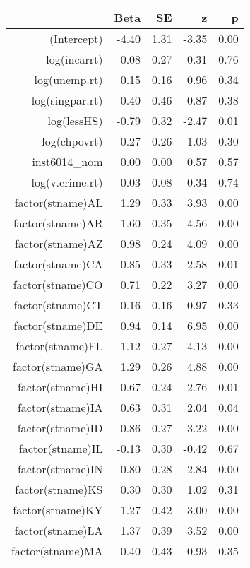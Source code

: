 \begin{table}[ht]
\centering
\begin{tabular}{rrrrr}
  \hline
 & Beta & SE & z & p \\ 
  \hline
(Intercept) & -4.40 & 1.31 & -3.35 & 0.00 \\ 
  log(incarrt) & -0.08 & 0.27 & -0.31 & 0.76 \\ 
  log(unemp.rt) & 0.15 & 0.16 & 0.96 & 0.34 \\ 
  log(singpar.rt) & -0.40 & 0.46 & -0.87 & 0.38 \\ 
  log(lessHS) & -0.79 & 0.32 & -2.47 & 0.01 \\ 
  log(chpovrt) & -0.27 & 0.26 & -1.03 & 0.30 \\ 
  inst6014\_nom & 0.00 & 0.00 & 0.57 & 0.57 \\ 
  log(v.crime.rt) & -0.03 & 0.08 & -0.34 & 0.74 \\ 
  factor(stname)AL & 1.29 & 0.33 & 3.93 & 0.00 \\ 
  factor(stname)AR & 1.60 & 0.35 & 4.56 & 0.00 \\ 
  factor(stname)AZ & 0.98 & 0.24 & 4.09 & 0.00 \\ 
  factor(stname)CA & 0.85 & 0.33 & 2.58 & 0.01 \\ 
  factor(stname)CO & 0.71 & 0.22 & 3.27 & 0.00 \\ 
  factor(stname)CT & 0.16 & 0.16 & 0.97 & 0.33 \\ 
  factor(stname)DE & 0.94 & 0.14 & 6.95 & 0.00 \\ 
  factor(stname)FL & 1.12 & 0.27 & 4.13 & 0.00 \\ 
  factor(stname)GA & 1.29 & 0.26 & 4.88 & 0.00 \\ 
  factor(stname)HI & 0.67 & 0.24 & 2.76 & 0.01 \\ 
  factor(stname)IA & 0.63 & 0.31 & 2.04 & 0.04 \\ 
  factor(stname)ID & 0.86 & 0.27 & 3.22 & 0.00 \\ 
  factor(stname)IL & -0.13 & 0.30 & -0.42 & 0.67 \\ 
  factor(stname)IN & 0.80 & 0.28 & 2.84 & 0.00 \\ 
  factor(stname)KS & 0.30 & 0.30 & 1.02 & 0.31 \\ 
  factor(stname)KY & 1.27 & 0.42 & 3.00 & 0.00 \\ 
  factor(stname)LA & 1.37 & 0.39 & 3.52 & 0.00 \\ 
  factor(stname)MA & 0.40 & 0.43 & 0.93 & 0.35 \\ 

\end{tabular}
\end{table}
